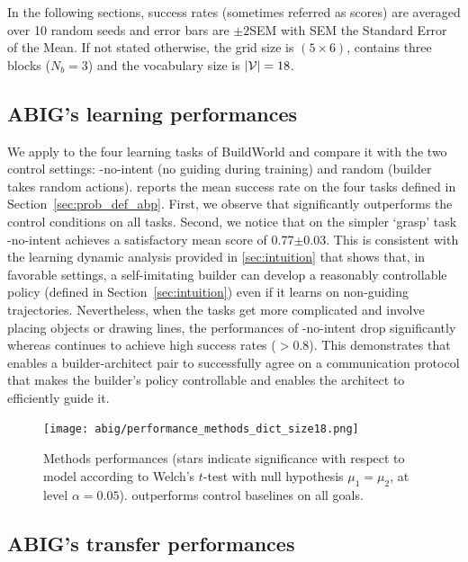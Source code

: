 In the following sections, success rates (sometimes referred as scores) are averaged over 10 random seeds and error bars are $\pm2$SEM with SEM the Standard Error of the Mean. If not stated otherwise, the grid size is $(5\times 6)$, contains three blocks ($N_b=3$) and the vocabulary size is $|{\mathcal{V}}|=18$.

\subsection{ABIG's learning performances}

We apply \abig to the four learning tasks of BuildWorld and compare it with the two control settings: \abig-no-intent (no guiding during training) and random (builder takes random actions).  reports the mean success rate on the four tasks defined in Section~\ref{sec:prob_def_abp}. First, we observe that \abim significantly outperforms the control conditions on all tasks. Second, we notice that on the simpler `grasp' task \abim-no-intent achieves a satisfactory mean score of 0.77$\pm0.03$. This is consistent with the learning dynamic analysis provided in \ref{sec:intuition} that shows that, in favorable settings, a self-imitating builder can develop a reasonably controllable policy (defined in Section~\ref{sec:intuition}) even if it learns on non-guiding trajectories.
Nevertheless, when the tasks get more complicated and involve placing objects or drawing lines, the performances of \abim-no-intent drop significantly whereas \abim continues to achieve high success rates ($>0.8$). 
This demonstrates that \abim enables a builder-architect pair to successfully agree on a communication protocol that makes the builder's policy controllable and enables the architect to efficiently guide it. 
%
\begin{figure}[!h]
    \centering
    \vspace{-.2cm}
    \texttt{[image: abig/performance\_methods\_dict\_size18.png]}
    \vspace{-.3cm}
    \caption{Methods performances (stars indicate significance with respect to \abim model according to Welch's $t$-test with null hypothesis $\mu_1=\mu_2$, at level $\alpha=0.05$). \abig outperforms control baselines on all goals.}
    \label{fig:methods_performance}
\end{figure}

\subsection{ABIG's transfer performances}

